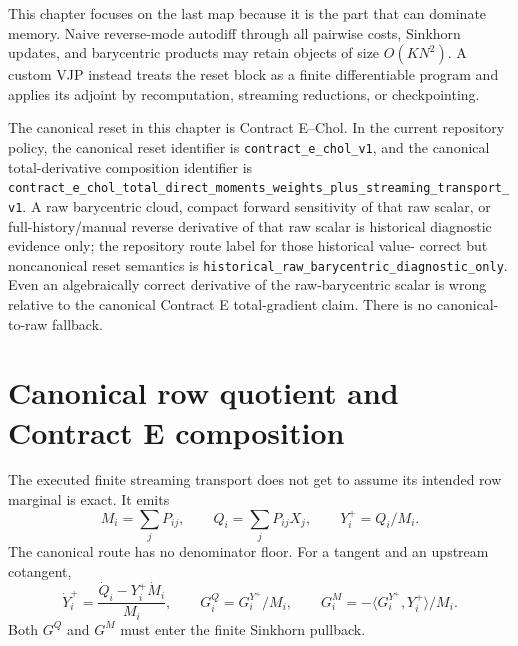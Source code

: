 This chapter focuses on the last map because it is the part that can dominate
memory.  Naive reverse-mode autodiff through all pairwise costs, Sinkhorn
updates, and barycentric products may retain objects of size \(O(KN^2)\).  A
custom VJP instead treats the reset block as a finite differentiable program and
applies its adjoint by recomputation, streaming reductions, or checkpointing.

The canonical reset in this chapter is Contract E--Chol.  In the current
repository policy, the canonical reset identifier is
\texttt{contract\_e\_chol\_v1}, and the canonical total-derivative composition
identifier is
\texttt{contract\_e\_chol\_total\_direct\_moments\_weights\_plus\_streaming\_transport\_v1}.
A raw barycentric cloud, compact forward sensitivity of that raw scalar, or
full-history/manual reverse derivative of that raw scalar is historical
diagnostic evidence only; the repository route label for those historical value-
correct but noncanonical reset semantics is
\texttt{historical\_raw\_barycentric\_diagnostic\_only}.  Even an algebraically
correct derivative of the raw-barycentric scalar is wrong relative to the
canonical Contract E total-gradient claim.  There is no canonical-to-raw
fallback.

\section{Canonical row quotient and Contract E composition}
\label{sec:bf-ledh-contract-e-total-composition}

The executed finite streaming transport does not get to assume its intended
row marginal is exact.  It emits
\begin{equation}
\label{eq:bf-ledh-contract-e-row-quotient}
  M_i=\sum_jP_{ij},\qquad
  Q_i=\sum_jP_{ij}X_j,\qquad
  Y_i^+=Q_i/M_i .
\end{equation}
The canonical route has no denominator floor.  For a tangent and an upstream
cotangent,
\begin{equation}
\label{eq:bf-ledh-contract-e-row-quotient-jvp-vjp}
  \dot Y_i^+=\frac{\dot Q_i-Y_i^+\dot M_i}{M_i},\qquad
  G_i^Q=G_i^{Y^+}/M_i,\qquad
  G_i^M=-\langle G_i^{Y^+},Y_i^+\rangle/M_i .
\end{equation}
Both \(G^Q\) and \(G^M\) must enter the finite Sinkhorn pullback.

